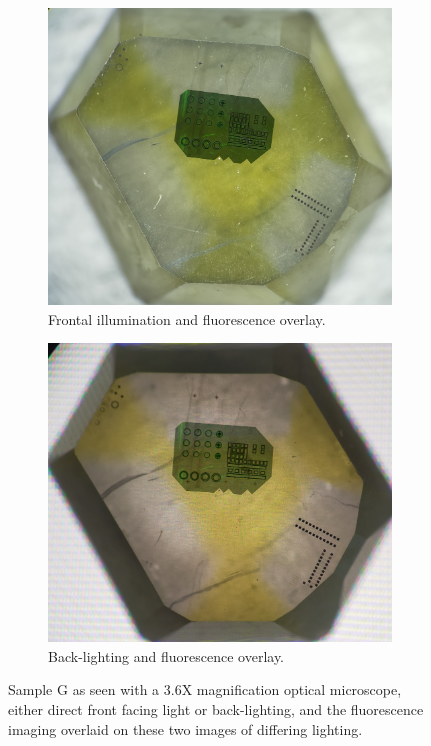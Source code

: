 \begin{refsection}
\begin{figure}[H]
\vspace{1em} %

\begin{subfigure}[t]{0.47\textwidth}
    \includegraphics[width=\textwidth]{Chapter7/Figs/Raster/optical front light overlay.jpg}
    \caption{Frontal illumination and fluorescence overlay.}
    \label{fig:G_front_overlay}
\end{subfigure}
\hfill
\begin{subfigure}[t]{0.47\textwidth}
    \includegraphics[width=\textwidth]{Chapter7/Figs/Raster/optical back light overlay.jpg}
    \caption{Back-lighting and fluorescence overlay.}
    \label{fig:G_back_overlay}
\end{subfigure}
\caption{Sample G as seen with a 3.6X magnification optical microscope, either direct front facing light or back-lighting, and the fluorescence imaging overlaid on these two images of differing lighting.}
\label{fig:G_illuminations}
\end{figure}


\end{refsection}
